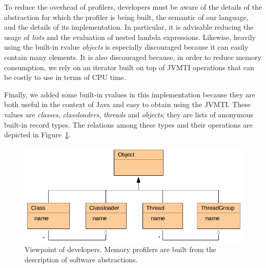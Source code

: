 To reduce the overhead of profilers, developers must be aware of the details of the abstraction for which the profiler is being built, the semantic of our language, and the details of its implementation.
In particular, it is advisable reducing the usage of \textit{lists} and the evaluation of nested lambda expressions.
Likewise, heavily using the built-in rvalue \textit{objects} is especially discouraged because it can easily contain many elements.
It is also discouraged because, in order to reduce memory consumption, we rely on an iterator built on top of JVMTI operations that can be costly to use in terms of CPU time.

Finally, we added some built-in rvalues in this implementation because they are both useful in the context of Java and easy to obtain using the JVMTI.
These values are \textit{classes}, \textit{classloaders}, \textit{threads} and \textit{objects}; they are lists of anonymous built-in record types.
The relations among these types and their operations are depicted in Figure~\ref{fig:dsl-built-in-types}.

\begin{figure}
\centering
\includegraphics[scale=0.45]{./chapter6/fig/diagram-classes.png}
\caption{Viewpoint of developers. Memory profilers are built from the description of software abstractions.}\label{fig:dsl-built-in-types}
\end{figure}


